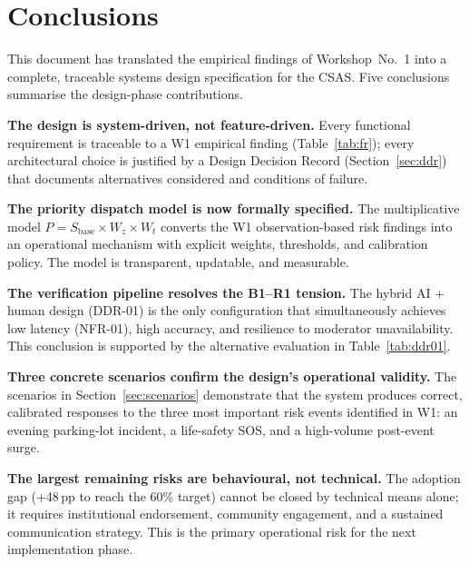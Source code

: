 \documentclass[12pt,a4paper]{article}
\begin{document}
\section{Conclusions}

This document has translated the empirical findings of Workshop~No.~1
into a complete, traceable systems design specification for the CSAS.
Five conclusions summarise the design-phase contributions.

\textbf{The design is system-driven, not feature-driven.} Every
functional requirement is traceable to a W1 empirical finding
(Table~\ref{tab:fr}); every architectural choice is justified by a
Design Decision Record (Section~\ref{sec:ddr}) that documents
alternatives considered and conditions of failure.

\textbf{The priority dispatch model is now formally specified.} The
multiplicative model $P = S_{\text{base}} \times W_z \times W_t$
converts the W1 observation-based risk findings into an operational
mechanism with explicit weights, thresholds, and calibration policy.
The model is transparent, updatable, and measurable.

\textbf{The verification pipeline resolves the B1--R1 tension.} The
hybrid AI + human design (DDR-01) is the only configuration that
simultaneously achieves low latency (NFR-01), high accuracy, and
resilience to moderator unavailability. This conclusion is supported
by the alternative evaluation in Table~\ref{tab:ddr01}.

\textbf{Three concrete scenarios confirm the design's operational
validity.} The scenarios in Section~\ref{sec:scenarios} demonstrate
that the system produces correct, calibrated responses to the three
most important risk events identified in W1: an evening parking-lot
incident, a life-safety SOS, and a high-volume post-event surge.

\textbf{The largest remaining risks are behavioural, not technical.}
The adoption gap ($+$48\,pp to reach the 60\% target) cannot be
closed by technical means alone; it requires institutional endorsement,
community engagement, and a sustained communication strategy. This
is the primary operational risk for the next implementation phase.

\end{document}
